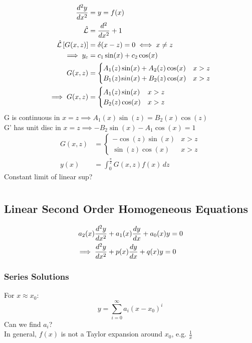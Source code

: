\documentclass[Maths.tex]{subfiles}
\begin{document}
\begin{example}
\begin{align*}
    \frac{d^2 y}{dx^2} &= y = f(x) \\
    \hat{\mathcal{L}} &= \frac{d^2}{dx^2} + 1 \\
    \hat{\mathcal{L}}\left[G(x,z)\right] &= \delta(x-z) = 0 \iff x \neq z \\
    \implies y_c &= c_1\sin(x) +c_2\cos(x) \\
    G(x,z) &= \begin{cases} A_1(z)\sin(x) + A_2(z)\cos(x) & x > z \\ B_1(z)sin(x) + B_2(z)\cos(x) & x > z \end{cases} \\
    \implies G(x,z) &= \begin{cases} A_1(z)\sin(x) & x > z \\ B_2(z)\cos(x) & x > z \end{cases}
\end{align*}
G is continuous in $x = z \implies A_1(x)\sin(z) = B_2(x)\cos(z)$ \\
G' has unit disc in $x = z \implies -B_2\sin(x) - A_1\cos(x) = 1$
\begin{align*}
    G(x,z) &= \begin{cases} -\cos(z)\sin(x) & x > z \\ \sin(z)\cos(x) & x > z \end{cases} \\
    y(x) &= \int_0^{\frac{\pi}{2}} G(x,z)f(x)\,dz
\end{align*}
Constant limit of linear sup?
\end{example}

\chapter{}
\section{Linear Second Order Homogeneous Equations}
\begin{align*}
    a_2(x)\frac{d^2 y}{dx^2} &+ a_1(x)\frac{dy}{dx} + a_0(x)y = 0 \\
    \implies \frac{d^2 y}{dx^2} &+ p(x)\frac{dy}{dx} + q(x)y = 0
\end{align*}

\subsection{Series Solutions}
For $x \approx x_0:$
\begin{equation*}
    y = \sum_{i=0}^\infty a_i(x-x_0)^i
\end{equation*}
Can we find $a_i$? \\
In general, $f(x)$ is not a Taylor expansion around $x_0$, e.g. $\frac{1}{x}$
\end{document}
